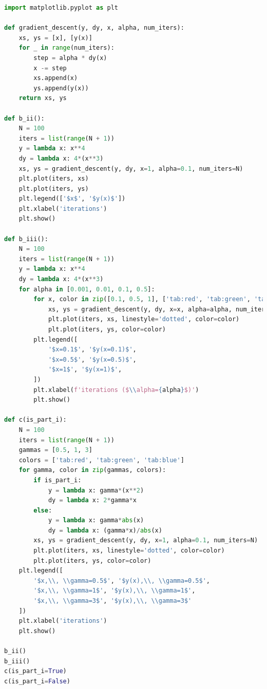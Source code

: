 \documentclass[12pt]{article}
\begin{document}
\lstset{basicstyle=\footnotesize}
\begin{lstlisting}[language=Python]
import matplotlib.pyplot as plt

def gradient_descent(y, dy, x, alpha, num_iters):
    xs, ys = [x], [y(x)]
    for _ in range(num_iters):
        step = alpha * dy(x)
        x -= step
        xs.append(x)
        ys.append(y(x))
    return xs, ys

def b_ii():
    N = 100
    iters = list(range(N + 1))
    y = lambda x: x**4
    dy = lambda x: 4*(x**3)
    xs, ys = gradient_descent(y, dy, x=1, alpha=0.1, num_iters=N)
    plt.plot(iters, xs)
    plt.plot(iters, ys)
    plt.legend(['$x$', '$y(x)$'])
    plt.xlabel('iterations')
    plt.show()
    
def b_iii():
    N = 100
    iters = list(range(N + 1))
    y = lambda x: x**4
    dy = lambda x: 4*(x**3)
    for alpha in [0.001, 0.01, 0.1, 0.5]:
        for x, color in zip([0.1, 0.5, 1], ['tab:red', 'tab:green', 'tab:blue']):
            xs, ys = gradient_descent(y, dy, x=x, alpha=alpha, num_iters=N)
            plt.plot(iters, xs, linestyle='dotted', color=color)
            plt.plot(iters, ys, color=color)
        plt.legend([
            '$x=0.1$', '$y(x=0.1)$',
            '$x=0.5$', '$y(x=0.5)$',
            '$x=1$', '$y(x=1)$',
        ])
        plt.xlabel(f'iterations ($\\alpha={alpha}$)')
        plt.show()

def c(is_part_i):
    N = 100
    iters = list(range(N + 1))
    gammas = [0.5, 1, 3]
    colors = ['tab:red', 'tab:green', 'tab:blue']
    for gamma, color in zip(gammas, colors):
        if is_part_i:
            y = lambda x: gamma*(x**2)
            dy = lambda x: 2*gamma*x
        else:
            y = lambda x: gamma*abs(x)
            dy = lambda x: (gamma*x)/abs(x)
        xs, ys = gradient_descent(y, dy, x=1, alpha=0.1, num_iters=N)
        plt.plot(iters, xs, linestyle='dotted', color=color)
        plt.plot(iters, ys, color=color)
    plt.legend([
        '$x,\\, \\gamma=0.5$', '$y(x),\\, \\gamma=0.5$',
        '$x,\\, \\gamma=1$', '$y(x),\\, \\gamma=1$',
        '$x,\\, \\gamma=3$', '$y(x),\\, \\gamma=3$'
    ])
    plt.xlabel('iterations')
    plt.show()

b_ii()
b_iii()
c(is_part_i=True)
c(is_part_i=False)
\end{lstlisting}
\end{document}

